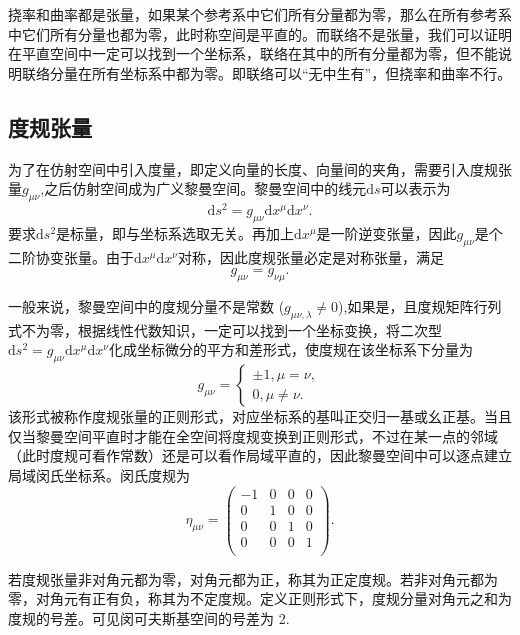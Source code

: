 \documentclass[11pt, a4paper, oneside, onecolumn]{ctexart}
\numberwithin{equation}{subsection}
\begin{document}
挠率和曲率都是张量，如果某个参考系中它们所有分量都为零，那么在所有参考系中它们所有分量也都为零，此时称空间是平直的。而联络不是张量，我们可以证明在平直空间中一定可以找到一个坐标系，联络在其中的所有分量都为零，但不能说明联络分量在所有坐标系中都为零。即联络可以“无中生有”，但挠率和曲率不行。

\subsection{度规张量}
为了在仿射空间中引入度量，即定义向量的长度、向量间的夹角，需要引入度规张量$g_{\mu\nu}$,之后仿射空间成为广义黎曼空间。黎曼空间中的线元$\mathrm{d}s$可以表示为
\begin{equation}
\mathrm{d}s^{2}=g_{\mu\nu}\mathrm{d}x^{\mu}\mathrm{d}x^{\nu}.
\end{equation}
要求$\mathrm{d}s^{2}$是标量，即与坐标系选取无关。再加上$\mathrm{d}x^{\mu}$是一阶逆变张量，因此$g_{\mu\nu}$是个二阶协变张量。由于$\mathrm{d}x^{\mu}\mathrm{d}x^{\nu}$对称，因此度规张量必定是对称张量，满足
\begin{equation}
g_{\mu\nu}=g_{\nu\mu}.
\end{equation}

一般来说，黎曼空间中的度规分量不是常数 ($g_{\mu\nu,\lambda}\ne0$),如果是，且度规矩阵行列式不为零，根据线性代数知识，一定可以找到一个坐标变换，将二次型$\mathrm{d}s^{2}=g_{\mu\nu}\mathrm{d}x^{\mu}\mathrm{d}x^{\nu}$化成坐标微分的平方和差形式，使度规在该坐标系下分量为
\begin{equation}
g_{\mu\nu}=
\begin{cases}
\pm1,\mu=\nu,\\
0,\mu\ne\nu.
\end{cases}
\end{equation}
该形式被称作度规张量的正则形式，对应坐标系的基叫正交归一基或幺正基。当且仅当黎曼空间平直时才能在全空间将度规变换到正则形式，不过在某一点的邻域（此时度规可看作常数）还是可以看作局域平直的，因此黎曼空间中可以逐点建立局域闵氏坐标系。闵氏度规为
\begin{equation}
\eta_{\mu\nu}=
\begin{pmatrix}
-1 & 0 & 0 & 0\\
0 & 1 & 0 & 0\\
0 & 0 & 1 & 0\\
0 & 0 & 0 & 1\\
\end{pmatrix}.
\end{equation}

若度规张量非对角元都为零，对角元都为正，称其为正定度规。若非对角元都为零，对角元有正有负，称其为不定度规。定义正则形式下，度规分量对角元之和为度规的号差。可见闵可夫斯基空间的号差为 2.
\end{document}
